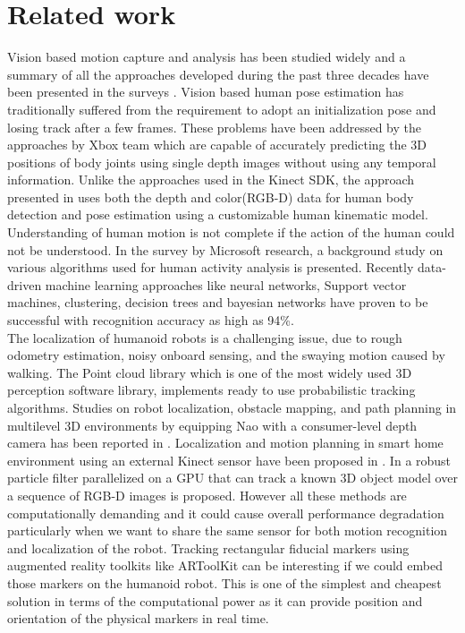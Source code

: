 \documentclass{llncs}
\begin{document}
\section{Related work}
%
%
	Vision based motion capture and analysis has been studied widely and a summary of all the approaches developed during the past three decades have been presented in the surveys \cite{Moeslund2001231} \cite{Moeslund200690}\cite{Poppe20074}. Vision based human pose estimation has traditionally suffered from the requirement to adopt an initialization pose and losing track after a few frames. These problems have been addressed by the approaches by Xbox\cite{Kinect2014} team which are capable of accurately predicting the 3D positions of body joints using single depth images without using any temporal information\cite{Shotton2011}\cite{Shotton2013}. Unlike the approaches used in the Kinect SDK, the approach presented in \cite{Buys201439} uses both the depth and color(RGB-D) data for human body detection and pose estimation using a customizable human kinematic model. Understanding of human motion is not complete if the action of the human could not be understood. In the survey by Microsoft research\cite{KinectCV2013}, a background study on various algorithms used for human activity analysis is presented. Recently data-driven machine learning approaches like neural networks, Support vector machines, clustering, decision trees and bayesian networks have proven to be successful with recognition accuracy as high as 94\%\cite{KinectSDK2014}.\\
	The localization of humanoid robots is a challenging issue, due to rough odometry estimation, noisy onboard sensing, and the swaying motion caused by walking\cite{Cervera2012}. The Point cloud library\cite{RusuPCL11} which is one of the most widely used 3D perception software library, implements ready to use probabilistic tracking algorithms\cite{RUeda2012}. Studies on robot localization, obstacle mapping, and path planning in multilevel 3D environments by equipping Nao with a consumer-level depth camera has been reported in \cite{Maier2012}. Localization and motion planning in smart home environment using an external Kinect sensor have been proposed in \cite{Cervera2012}. In \cite{choi13_rgb_d_objec_track} a robust particle filter parallelized on a GPU that can track a known 3D object model over a sequence of RGB-D images is proposed. However all these methods are computationally demanding and it could cause overall performance degradation particularly when we want to share the same sensor for both motion recognition and localization of the robot.  Tracking rectangular fiducial markers using  augmented reality toolkits like ARToolKit\cite{Kato1999} can be interesting if we could embed those markers on the humanoid robot. This is one of the simplest and cheapest solution in terms of the computational power as it can provide position and orientation of the physical markers in real time.\\
\end{document}
